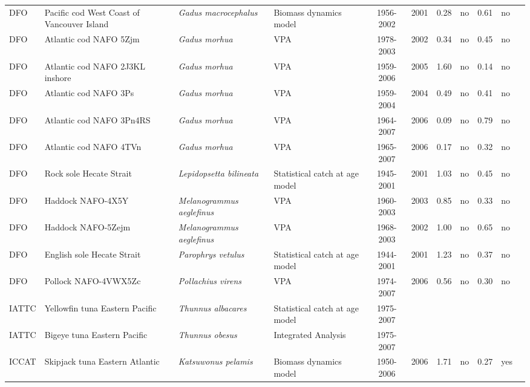 \begin{longtable}{p{1.8cm}p{3.5cm}p{3.5cm}p{3cm}cccp{0.9cm}cp{0.9cm}c}
  DFO & Pacific cod West Coast of Vancouver Island & \textit{Gadus macrocephalus} & Biomass dynamics model & 1956-2002 & 2001 & 0.28 & no & 0.61 & no & \cite{ref2002-113.pdf} \\ 
  DFO & Atlantic cod NAFO 5Zjm & \textit{Gadus morhua} & VPA & 1978-2003 & 2002 & 0.34 & no & 0.45 & no & \cite{NAFO-COD5Zjm-2003.pdf} \\ 
  DFO & Atlantic cod NAFO 2J3KL inshore & \textit{Gadus morhua} & VPA & 1959-2006 & 2005 & 1.60 & no & 0.14 & no & \cite{DFO-COD2J3KLIS-2006.pdf} \\ 
  DFO & Atlantic cod NAFO 3Ps & \textit{Gadus morhua} & VPA & 1959-2004 & 2004 & 0.49 & no & 0.41 & no & \cite{DFO-COD3Ps-2004.pdf} \\ 
  DFO & Atlantic cod NAFO 3Pn4RS & \textit{Gadus morhua} & VPA & 1964-2007 & 2006 & 0.09 & no & 0.79 & no & \cite{DFO-COD3Pn4Rs-2007.pdf} \\ 
  DFO & Atlantic cod NAFO 4TVn & \textit{Gadus morhua} & VPA & 1965-2007 & 2006 & 0.17 & no & 0.32 & no & \cite{NAFO-COD4TVn-2007.pdf} \\ 
  DFO & Rock sole Hecate Strait & \textit{Lepidopsetta bilineata} & Statistical catch at age model & 1945-2001 & 2001 & 1.03 & no & 0.45 & no & \cite{Flat99.pdf} \\ 
  DFO & Haddock NAFO-4X5Y & \textit{Melanogrammus aeglefinus} & VPA & 1960-2003 & 2003 & 0.85 & no & 0.33 & no & \cite{NAFO-HAD4X5Y-2003.pdf} \\ 
  DFO & Haddock NAFO-5Zejm & \textit{Melanogrammus aeglefinus} & VPA & 1968-2003 & 2002 & 1.00 & no & 0.65 & no & \cite{NAFO-HAD5Zejm-2003.pdf} \\ 
  DFO & English sole Hecate Strait & \textit{Parophrys vetulus} & Statistical catch at age model & 1944-2001 & 2001 & 1.23 & no & 0.37 & no & \cite{Flat99.pdf} \\ 
  DFO & Pollock NAFO-4VWX5Zc & \textit{Pollachius virens} & VPA & 1974-2007 & 2006 & 0.56 & no & 0.30 & no & \cite{NAFO-POLL4VWX5Zc-2006.pdf} \\ 
  IATTC & Yellowfin tuna Eastern Pacific & \textit{Thunnus albacares} & Statistical catch at age model & 1975-2007 &  &  &  &  &  & \cite{SAR8-YFT-ENG.pdf} \\ 
  IATTC & Bigeye tuna Eastern Pacific & \textit{Thunnus obesus} & Integrated Analysis & 1975-2007 &  &  &  &  &  & \cite{JENSEN_BETEPAC_2008.pdf} \\ 
  ICCAT & Skipjack tuna Eastern Atlantic & \textit{Katsuwonus pelamis} & Biomass dynamics model & 1950-2006 & 2006 & 1.71 & no & 0.27 & yes & \cite{JENSEN-YFINATL-2008.pdf} \\ 

\end{longtable}
